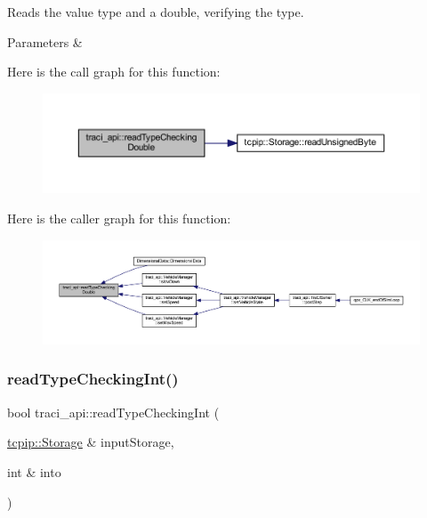 Reads the value type and a double, verifying the type. 


\begin{DoxyParams}{Parameters}
{\em } & \\
\hline
\end{DoxyParams}
Here is the call graph for this function\+:\nopagebreak
\begin{figure}[H]
\begin{center}
\leavevmode
\includegraphics[width=350pt]{namespacetraci__api_a5229be0b43fc9f5d9f413d5e51924b50_cgraph}
\end{center}
\end{figure}
Here is the caller graph for this function\+:\nopagebreak
\begin{figure}[H]
\begin{center}
\leavevmode
\includegraphics[width=350pt]{namespacetraci__api_a5229be0b43fc9f5d9f413d5e51924b50_icgraph}
\end{center}
\end{figure}
\mbox{\label{namespacetraci__api_a57c1a8583619eb1e9984249249435f8e}} 
\subsubsection{\texorpdfstring{read\+Type\+Checking\+Int()}{readTypeCheckingInt()}}
{\footnotesize\ttfamily bool traci\+\_\+api\+::read\+Type\+Checking\+Int (\begin{DoxyParamCaption}\item[{\hyperlink{classtcpip_1_1_storage}{tcpip\+::\+Storage} \&}]{input\+Storage,  }\item[{int \&}]{into }\end{DoxyParamCaption})}



